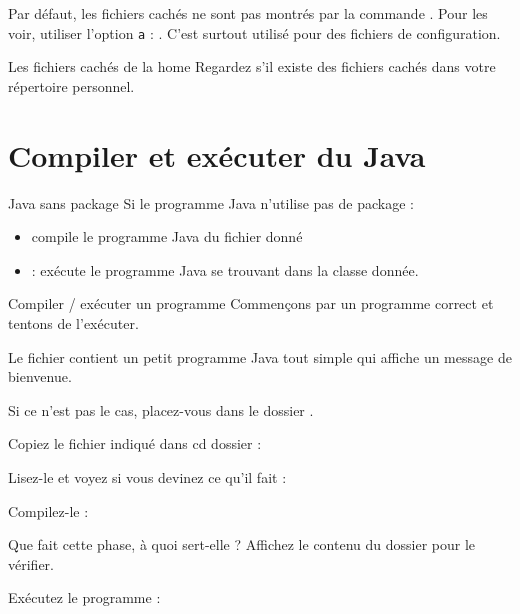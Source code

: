 \documentclass[a4paper,11pt]{style-esi/td}
\begin{document}
		Par défaut, 
		les fichiers cachés ne sont pas montrés par la commande .
		Pour les voir, utiliser l'option \texttt{a} : .
		C'est surtout utilisé pour des fichiers de configuration.

		\begin{Exercice}{Les fichiers cachés de la home}
			Regardez s'il existe des fichiers cachés
			dans votre répertoire personnel.
		\end{Exercice}

\section{Compiler et exécuter du Java}

    \begin{theorie}{Java sans package}
        Si le programme Java n'utilise pas de package :
        \begin{itemize}
            \item {} compile le programme Java du fichier donné
            \item {} : exécute le programme Java se trouvant dans la classe donnée.
        \end{itemize}
    \end{theorie}

	\begin{Tutoriel}{Compiler / exécuter un programme} 
		Commençons par un programme correct et tentons de l'exécuter.  
      
        Le fichier  
        contient un petit programme Java tout simple qui affiche un message de bienvenue. 
        
		\begin{steps}	
        \item 
            Si ce n'est pas le cas, placez-vous dans le dossier .
        \item 
            Copiez le fichier indiqué dans cd dossier :
        \item 
            Lisez-le et voyez si vous devinez ce qu'il fait : 
        \item 
            Compilez-le : 
        \item 
            Que fait cette phase, à quoi sert-elle ?
            Affichez le contenu du dossier pour le vérifier.
		\item Exécutez le programme : 
		\end{steps}			
	\end{Tutoriel}
\end{document}
